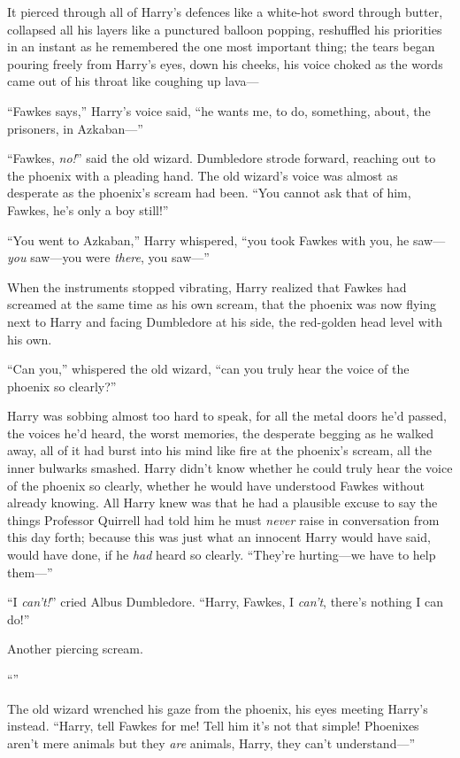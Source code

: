 It pierced through all of Harry’s defences like a white-hot sword through butter, collapsed all his layers like a punctured balloon popping, reshuffled his priorities in an instant as he remembered the one most important thing; the tears began pouring freely from Harry’s eyes, down his cheeks, his voice choked as the words came out of his throat like coughing up lava—

“Fawkes says,” Harry’s voice said, “he wants me, to do, something, about, the prisoners, in Azkaban—”

“Fawkes, \emph{no!}” said the old wizard. Dumbledore strode forward, reaching out to the phoenix with a pleading hand. The old wizard’s voice was almost as desperate as the phoenix’s scream had been. “You cannot ask that of him, Fawkes, he’s only a boy still!”

“You went to Azkaban,” Harry whispered, “you took Fawkes with you, he saw—\emph{you} saw—you were \emph{there}, you saw—”

When the instruments stopped vibrating, Harry realized that Fawkes had screamed at the same time as his own scream, that the phoenix was now flying next to Harry and facing Dumbledore at his side, the red-golden head level with his own.

“Can you,” whispered the old wizard, “can you truly hear the voice of the phoenix so clearly?”

Harry was sobbing almost too hard to speak, for all the metal doors he’d passed, the voices he’d heard, the worst memories, the desperate begging as he walked away, all of it had burst into his mind like fire at the phoenix’s scream, all the inner bulwarks smashed. Harry didn’t know whether he could truly hear the voice of the phoenix so clearly, whether he would have understood Fawkes without already knowing. All Harry knew was that he had a plausible excuse to say the things Professor Quirrell had told him he must \emph{never} raise in conversation from this day forth; because this was just what an innocent Harry would have said, would have done, if he \emph{had} heard so clearly. “They’re hurting—we have to help them—”

“I \emph{can’t!}” cried Albus Dumbledore. “Harry, Fawkes, I \emph{can’t}, there’s nothing I can do!”

Another piercing scream.

“”

The old wizard wrenched his gaze from the phoenix, his eyes meeting Harry’s instead. “Harry, tell Fawkes for me! Tell him it’s not that simple! Phoenixes aren’t mere animals but they \emph{are} animals, Harry, they can’t understand—”


